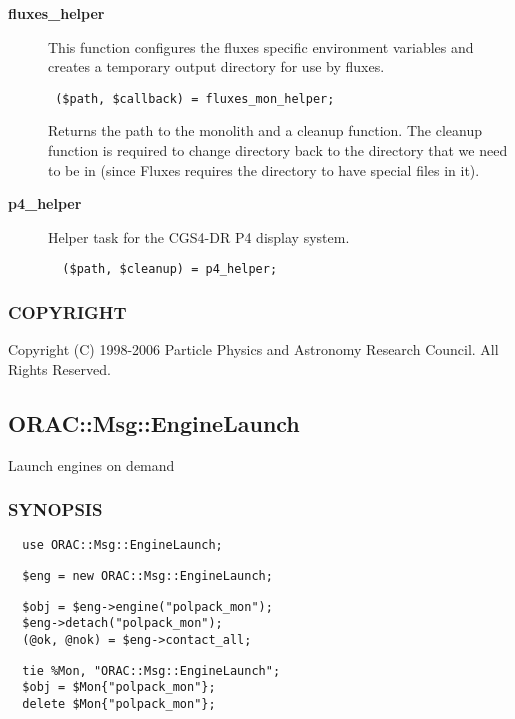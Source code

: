 \begin{description}

\item[{\textbf{fluxes\_helper}}] \mbox{}

This function configures the fluxes specific environment variables
and creates a temporary output directory for use by fluxes.

\begin{verbatim}
 ($path, $callback) = fluxes_mon_helper;
\end{verbatim}


Returns the path to the monolith and a cleanup function.
The cleanup function is required to change directory back to the
directory that we need to be in (since Fluxes requires the directory
to have special files in it).


\item[{\textbf{p4\_helper}}] \mbox{}

Helper task for the CGS4-DR P4 display system.

\begin{verbatim}
  ($path, $cleanup) = p4_helper;
\end{verbatim}
\end{description}
\subsubsection*{COPYRIGHT\label{ORAC::Inst::Defn_COPYRIGHT}}


Copyright (C) 1998-2006 Particle Physics and Astronomy Research
Council. All Rights Reserved.

\subsection{ORAC::Msg::EngineLaunch\label{ORAC::Msg::EngineLaunch}}


Launch engines on demand

\subsubsection*{SYNOPSIS\label{ORAC::Msg::EngineLaunch_SYNOPSIS}}
\begin{verbatim}
  use ORAC::Msg::EngineLaunch;
\end{verbatim}
\begin{verbatim}
  $eng = new ORAC::Msg::EngineLaunch;
\end{verbatim}
\begin{verbatim}
  $obj = $eng->engine("polpack_mon");
  $eng->detach("polpack_mon");
  (@ok, @nok) = $eng->contact_all;
\end{verbatim}
\begin{verbatim}
  tie %Mon, "ORAC::Msg::EngineLaunch";
  $obj = $Mon{"polpack_mon"};
  delete $Mon{"polpack_mon"};
\end{verbatim}

